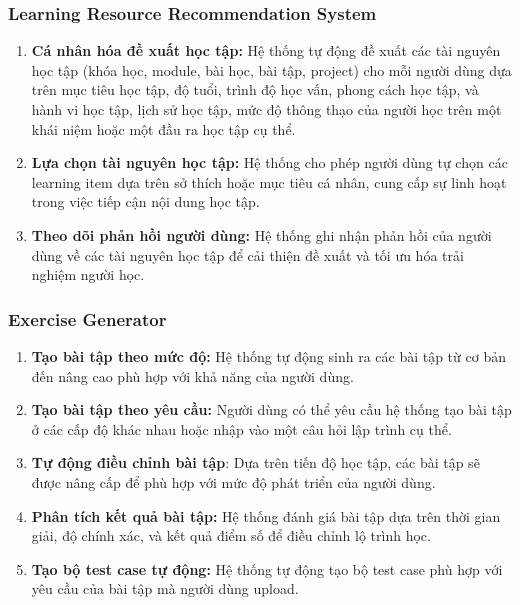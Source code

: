 \subsubsection{Learning Resource Recommendation System}
\begin{enumerate}
\item \textbf{Cá nhân hóa đề xuất học tập:} Hệ thống tự động đề xuất các tài nguyên học tập (khóa học, module, bài học, bài tập, project) cho mỗi người dùng dựa trên mục tiêu học tập, độ tuổi, trình độ học vấn, phong cách học tập, và hành vi học tập, lịch sử học tập, mức độ thông thạo của người học trên một khái niệm hoặc một đầu ra học tập cụ thể.
\item \textbf{Lựa chọn tài nguyên học tập:} Hệ thống cho phép người dùng tự chọn các learning item dựa trên sở thích hoặc mục tiêu cá nhân, cung cấp sự linh hoạt trong việc tiếp cận nội dung học tập.
\item \textbf{Theo dõi phản hồi người dùng:} Hệ thống ghi nhận phản hồi của người dùng về các tài nguyên học tập để cải thiện đề xuất và tối ưu hóa trải nghiệm người học.
\end{enumerate}
\subsubsection{Exercise Generator}
\begin{enumerate}
    \item \textbf{Tạo bài tập theo mức độ:} Hệ thống tự động sinh ra các bài tập từ cơ bản đến nâng cao phù hợp với khả năng của người dùng.
    \item \textbf{Tạo bài tập theo yêu cầu:} Người dùng có thể yêu cầu hệ thống tạo bài tập ở các cấp độ khác nhau hoặc nhập vào một câu hỏi lập trình cụ thể.
\item \textbf{Tự động điều chỉnh bài tập}: Dựa trên tiến độ học tập, các bài tập sẽ được nâng cấp để phù hợp với mức độ phát triển của người dùng.
\item \textbf{Phân tích kết quả bài tập:} Hệ thống đánh giá bài tập dựa trên thời gian giải, độ chính xác, và kết quả điểm số để điều chỉnh lộ trình học.
\item \textbf{Tạo bộ test case tự động:} Hệ thống tự động tạo bộ test case phù hợp với yêu cầu của bài tập mà người dùng upload.
\end{enumerate}
